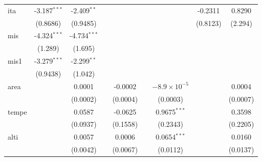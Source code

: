 \documentclass[
  a4paper,
]{article}
\begin{document}
{\begin{tabular}{lcccccccc}
   ita                      & -3.187$^{***}$ & -2.409$^{**}$          &               &                         &               &                              & -0.2311       & 0.8290\\   
                            & (0.8686)       & (0.9485)               &               &                         &               &                              & (0.8123)      & (2.294)\\   
   mis                      & -4.324$^{***}$ & -4.734$^{***}$         &               &                         &               &                              &               &   \\   
                            & (1.289)        & (1.695)                &               &                         &               &                              &               &   \\   
   mis1                     & -3.279$^{***}$ & -2.299$^{**}$          &               &                         &               &                              &               &   \\   
                            & (0.9438)       & (1.042)                &               &                         &               &                              &               &   \\   
   area                     &                & 0.0001                 &               & -0.0002                 &               & $-8.9\times 10^{-5}$         &               & 0.0004\\   
                            &                & (0.0002)               &               & (0.0004)                &               & (0.0003)                     &               & (0.0007)\\   
   tempe                    &                & 0.0587                 &               & -0.0625                 &               & 0.9675$^{***}$               &               & 0.3598\\   
                            &                & (0.0937)               &               & (0.1558)                &               & (0.2343)                     &               & (0.2205)\\   
   alti                     &                & 0.0057                 &               & 0.0006                  &               & 0.0654$^{***}$               &               & 0.0160\\   
                            &                & (0.0042)               &               & (0.0067)                &               & (0.0112)                     &               & (0.0137)\\   

\end{tabular}}
\end{document}
